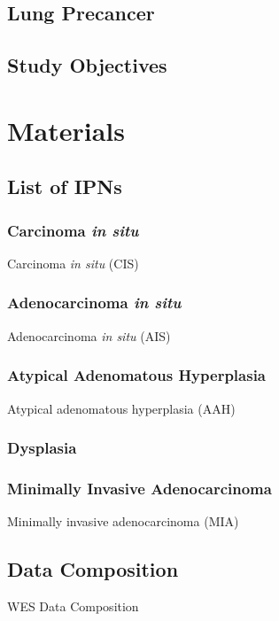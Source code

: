 \documentclass[11pt,a4paper,onecolumn,oneside]{report}
\begin{document}
        \subsection{Lung Precancer}

        \subsection{Study Objectives}
    \pagebreak

    \section{Materials}
        \subsection{List of IPNs}
            \subsubsection{Carcinoma \textit{in situ}}
                Carcinoma \textit{in situ} (CIS)

            \subsubsection{Adenocarcinoma \textit{in situ}}
                Adenocarcinoma \textit{in situ} (AIS)

            \subsubsection{Atypical Adenomatous Hyperplasia}
                Atypical adenomatous hyperplasia (AAH)

            \subsubsection{Dysplasia}

            \subsubsection{Minimally Invasive Adenocarcinoma}
                Minimally invasive adenocarcinoma (MIA)

        \subsection{Data Composition}
            \begin{table}[p]
                \centering
                \label{tb:WES-composition}
                \caption{WES Data Composition}
                
            \end{table}
\end{document}

